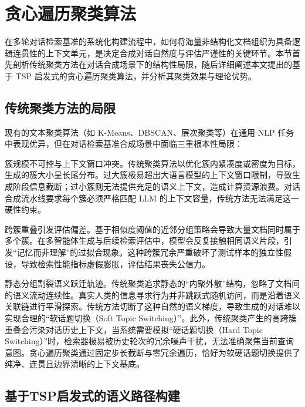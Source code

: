 \section{贪心遍历聚类算法}

\label{sec:greedy_clustering}



在多轮对话检索基准的系统化构建流程中，如何将海量非结构化文档组织为具备逻辑连贯性的上下文单元，是决定合成对话自然度与评估严谨性的关键环节。本节首先剖析传统聚类方法在对话合成场景下的结构性局限，随后详细阐述本文提出的基于 TSP 启发式的贪心遍历聚类算法，并分析其聚类效果与理论优势。



\subsection{传统聚类方法的局限}



现有的文本聚类算法（如 K-Means、DBSCAN、层次聚类等）在通用 NLP 任务中表现优异，但在对话检索基准合成场景中面临三重根本性局限：



簇规模不可控与上下文窗口冲突。传统聚类算法以优化簇内紧凑度或密度为目标，生成的簇大小呈长尾分布。过大簇极易超出大语言模型的上下文窗口限制，导致生成阶段信息截断；过小簇则无法提供充足的语义上下文，造成计算资源浪费。对话合成流水线要求每个簇必须严格匹配 LLM 的上下文容量，传统方法无法满足这一硬性约束。



跨簇重叠引发评估偏差。基于相似度阈值的近邻分组策略会导致大量文档同时属于多个簇。在多智能体生成与后续检索评估中，模型会反复接触相同语义片段，引发“记忆而非理解”的过拟合现象。这种跨簇冗余严重破坏了测试样本的独立性假设，导致检索性能指标虚假膨胀，评估结果丧失公信力。



静态分组割裂语义跃迁轨迹。传统聚类追求静态的“内聚外散”结构，忽略了文档间的语义流动连续性。真实人类的信息寻求行为并非跳跃式随机访问，而是沿着语义关联链进行平滑探索。传统方法切断了这种自然的语义梯度，导致生成的对话难以实现合理的“软话题切换（Soft Topic Switching）”。此外，传统聚类产生的高跨簇重叠会污染对话历史上下文，当系统需要模拟“硬话题切换（Hard Topic Switching）”时，检索器极易被历史轮次的冗余噪声干扰，无法准确聚焦当前查询意图。贪心遍历聚类通过固定步长截断与零冗余遍历，恰好为软硬话题切换提供了纯净、连贯且边界清晰的上下文基底。



\subsection{基于TSP启发式的语义路径构建}



